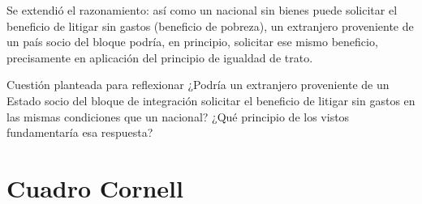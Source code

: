 \documentclass[12pt,oneside]{book}
\begin{document}
Se extendió el razonamiento: así como un nacional sin bienes puede solicitar el beneficio de litigar sin gastos (beneficio de pobreza), un extranjero proveniente de un país socio del bloque podría, en principio, solicitar ese mismo beneficio, precisamente en aplicación del principio de igualdad de trato.

\begin{exercise}{Cuestión planteada para reflexionar}
¿Podría un extranjero proveniente de un Estado socio del bloque de integración solicitar el beneficio de litigar sin gastos en las mismas condiciones que un nacional? ¿Qué principio de los vistos fundamentaría esa respuesta?
\end{exercise}

\section{Cuadro Cornell}
\end{document}
